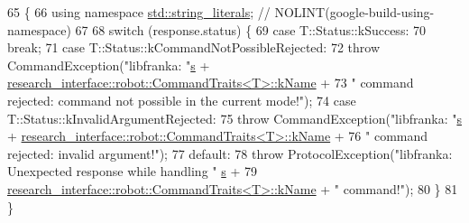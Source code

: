 \begin{DoxyCode}
65                                                 \{
66     \textcolor{keyword}{using namespace }\hyperlink{namespacestd_1_1string__literals}{std::string\_literals};  \textcolor{comment}{// NOLINT(google-build-using-namespace)}
67 
68     \textcolor{keywordflow}{switch} (response.status) \{
69       \textcolor{keywordflow}{case} T::Status::kSuccess:
70         \textcolor{keywordflow}{break};
71       \textcolor{keywordflow}{case} T::Status::kCommandNotPossibleRejected:
72         \textcolor{keywordflow}{throw} CommandException(\textcolor{stringliteral}{"libfranka: "}\hyperlink{namespaceservice__node__3_aa976421a49e0b54f23833423400849ae}{s} + 
      \hyperlink{structresearch__interface_1_1robot_1_1CommandTraits}{research\_interface::robot::CommandTraits<T>::kName} +
73                                \textcolor{stringliteral}{" command rejected: command not possible in the current mode!"});
74       \textcolor{keywordflow}{case} T::Status::kInvalidArgumentRejected:
75         \textcolor{keywordflow}{throw} CommandException(\textcolor{stringliteral}{"libfranka: "}\hyperlink{namespaceservice__node__3_aa976421a49e0b54f23833423400849ae}{s} + 
      \hyperlink{structresearch__interface_1_1robot_1_1CommandTraits}{research\_interface::robot::CommandTraits<T>::kName} +
76                                \textcolor{stringliteral}{" command rejected: invalid argument!"});
77       \textcolor{keywordflow}{default}:
78         \textcolor{keywordflow}{throw} ProtocolException(\textcolor{stringliteral}{"libfranka: Unexpected response while handling "}
      \hyperlink{namespaceservice__node__3_aa976421a49e0b54f23833423400849ae}{s} +
79                                 
      \hyperlink{structresearch__interface_1_1robot_1_1CommandTraits}{research\_interface::robot::CommandTraits<T>::kName} + \textcolor{stringliteral}{"
       command!"});
80     \}
81   \}
\end{DoxyCode}
\mbox{\label{classfranka_1_1Robot_1_1Impl_a939a959d9bb69ad7567d7d3a2aabea3e}} 
